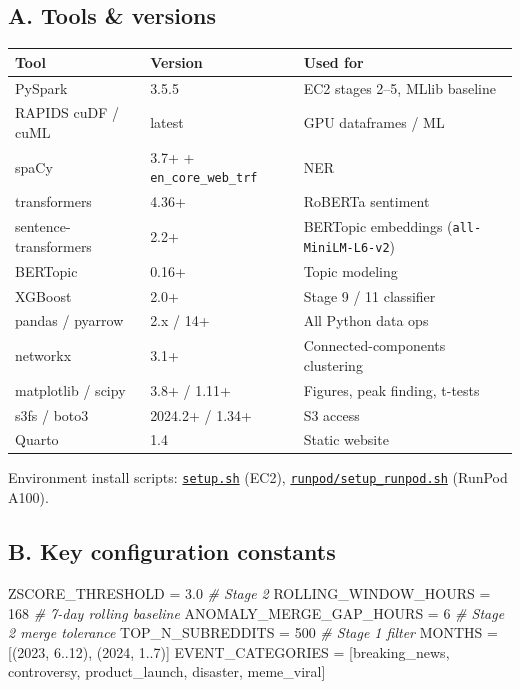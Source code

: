 \documentclass[
]{article}
\newenvironment{Shaded}{}{}
\newcommand{\CommentTok}[1]{\textcolor[rgb]{0.38,0.63,0.69}{\textit{#1}}}
\newcommand{\DecValTok}[1]{\textcolor[rgb]{0.25,0.63,0.44}{#1}}
\newcommand{\FloatTok}[1]{\textcolor[rgb]{0.25,0.63,0.44}{#1}}
\newcommand{\NormalTok}[1]{#1}
\newcommand{\OperatorTok}[1]{\textcolor[rgb]{0.40,0.40,0.40}{#1}}
\newcounter{none} %
\begin{document}
\subsection{A. Tools \& versions}\label{a-tools--versions}

{\def\LTcaptype{none} %
\begin{longtable}[]{@{}lll@{}}
\toprule\noalign{}
Tool & Version & Used for \\
\midrule\noalign{}
\endhead
\bottomrule\noalign{}
\endlastfoot
PySpark & 3.5.5 & EC2 stages 2--5, MLlib baseline \\
RAPIDS cuDF / cuML & latest & GPU dataframes / ML \\
spaCy & 3.7+ + \texttt{en\_core\_web\_trf} & NER \\
transformers & 4.36+ & RoBERTa sentiment \\
sentence-transformers & 2.2+ & BERTopic embeddings
(\texttt{all-MiniLM-L6-v2}) \\
BERTopic & 0.16+ & Topic modeling \\
XGBoost & 2.0+ & Stage 9 / 11 classifier \\
pandas / pyarrow & 2.x / 14+ & All Python data ops \\
networkx & 3.1+ & Connected-components clustering \\
matplotlib / scipy & 3.8+ / 1.11+ & Figures, peak finding, t-tests \\
s3fs / boto3 & 2024.2+ / 1.34+ & S3 access \\
Quarto & 1.4 & Static website \\
\end{longtable}
}

Environment install scripts: \href{setup.sh}{\texttt{setup.sh}} (EC2),
\href{runpod/setup_runpod.sh}{\texttt{runpod/setup\_runpod.sh}} (RunPod
A100).

\subsection{B. Key configuration constants} \label{b-key-configuration-constants-----configsettingspy}

\begin{Shaded}
\begin{Highlighting}[]
\NormalTok{ZSCORE\_THRESHOLD        }\OperatorTok{=} \FloatTok{3.0}      \CommentTok{\# Stage 2}
\NormalTok{ROLLING\_WINDOW\_HOURS    }\OperatorTok{=} \DecValTok{168}      \CommentTok{\# 7{-}day rolling baseline}
\NormalTok{ANOMALY\_MERGE\_GAP\_HOURS }\OperatorTok{=} \DecValTok{6}        \CommentTok{\# Stage 2 merge tolerance}
\NormalTok{TOP\_N\_SUBREDDITS        }\OperatorTok{=} \DecValTok{500}      \CommentTok{\# Stage 1 filter}
\NormalTok{MONTHS                  }\OperatorTok{=}\NormalTok{ [(}\DecValTok{2023}\NormalTok{, }\FloatTok{6..12}\NormalTok{), (}\DecValTok{2024}\NormalTok{, }\FloatTok{1..7}\NormalTok{)]}
\NormalTok{EVENT\_CATEGORIES        }\OperatorTok{=}\NormalTok{ [breaking\_news, controversy, product\_launch, disaster, meme\_viral]}
\end{Highlighting}
\end{Shaded}
\end{document}
